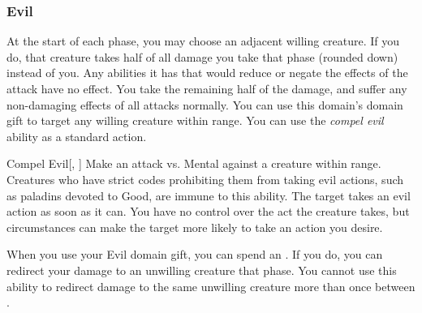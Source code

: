         \subsubsection{Evil}
             At the start of each phase, you may choose an adjacent willing creature.
            If you do, that creature takes half of all damage you take that phase (rounded down) instead of you.
            Any abilities it has that would reduce or negate the effects of the attack have no effect.
            You take the remaining half of the damage, and suffer any non-damaging effects of all attacks normally.
             You can use this domain's domain gift to target any willing creature within \rngclose range.
             You can use the \textit{compel evil} ability as a standard action.
            \begin{apability}{Compel Evil}[, ]
                Make an attack vs. Mental against a creature within \rngmed range.
                Creatures who have strict codes prohibiting them from taking evil actions, such as paladins devoted to Good, are immune to this ability.
                \hit The target takes an evil action as soon as it can.
                You have no control over the act the creature takes, but circumstances can make the target more likely to take an action you desire.
            \end{apability}
             When you use your Evil domain gift, you can spend an .
            If you do, you can redirect your damage to an unwilling creature that phase.
            You cannot use this ability to redirect damage to the same unwilling creature more than once between .

